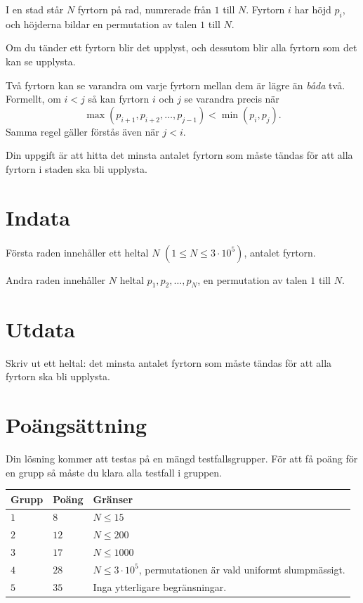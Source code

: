 \noindent

I en stad står $N$ fyrtorn på rad, numrerade från $1$ till $N$.
Fyrtorn $i$ har höjd $p_i$, och höjderna bildar en permutation av talen $1$ till $N$.

Om du tänder ett fyrtorn blir det upplyst, och dessutom blir alla fyrtorn som det kan se upplysta.

Två fyrtorn kan se varandra om varje fyrtorn mellan dem är lägre än \emph{båda} två.
Formellt, om $i < j$ så kan fyrtorn $i$ och $j$ se varandra precis när
\[
\max(p_{i+1}, p_{i+2}, \dots, p_{j-1}) < \min(p_i, p_j).
\]
Samma regel gäller förstås även när $j < i$.

Din uppgift är att hitta det minsta antalet fyrtorn som måste tändas för att alla fyrtorn i staden ska bli upplysta.

\section*{Indata}

Första raden innehåller ett heltal $N$ $(1 \leq N \leq 3 \cdot 10^5)$, antalet fyrtorn.

Andra raden innehåller $N$ heltal $p_1, p_2, \dots, p_N$, en permutation av talen $1$ till $N$.

\section*{Utdata}

Skriv ut ett heltal: det minsta antalet fyrtorn som måste tändas för att alla fyrtorn ska bli upplysta.

\section*{Poängsättning}
Din lösning kommer att testas på en mängd testfallsgrupper.
För att få poäng för en grupp så måste du klara alla testfall i gruppen.

\noindent
\begin{tabular}{| l | l | p{12cm} |}
  \hline
  \textbf{Grupp} & \textbf{Poäng} & \textbf{Gränser} \\ \hline
  $1$ & $8$ & $N \leq 15$ \\ \hline
  $2$ & $12$ & $N \leq 200$ \\ \hline
  $3$ & $17$ & $N \leq 1000$ \\ \hline
  $4$ & $28$ & $N \leq 3 \cdot 10^5$, permutationen är vald uniformt slumpmässigt. \\ \hline
  $5$ & $35$ & Inga ytterligare begränsningar. \\ \hline
\end{tabular}
